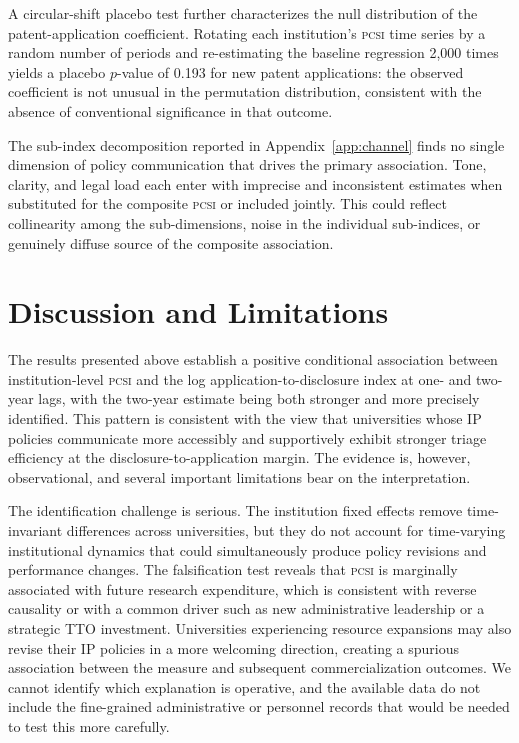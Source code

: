 \documentclass[12pt]{article}
\newcommand{\PCSI}{\textsc{pcsi}}
\begin{document}
A circular-shift placebo test further characterizes the null distribution of the patent-application
coefficient. Rotating each institution's \PCSI{} time series by a random number of periods
and re-estimating the baseline regression 2,000 times yields a placebo $p$-value of 0.193
for new patent applications: the observed coefficient is not unusual in the permutation
distribution, consistent with the absence of conventional significance in that outcome.

The sub-index decomposition reported in Appendix~\ref{app:channel} finds no single
dimension of policy communication that drives the primary association. Tone, clarity,
and legal load each enter with imprecise and inconsistent estimates when substituted for
the composite \PCSI{} or included jointly. This could reflect collinearity among the
sub-dimensions, noise in the individual sub-indices, or genuinely diffuse source of
the composite association.

\section{Discussion and Limitations}
\label{sec:discussion}

The results presented above establish a positive conditional association between
institution-level \PCSI{} and the log application-to-disclosure index at one- and
two-year lags, with the two-year estimate being both stronger and more precisely
identified. This pattern is consistent with the view that universities whose IP policies
communicate more accessibly and supportively exhibit stronger triage efficiency at the
disclosure-to-application margin. The evidence is, however, observational, and several
important limitations bear on the interpretation.

The identification challenge is serious. The institution fixed effects remove
time-invariant differences across universities, but they do not account for
time-varying institutional dynamics that could simultaneously produce policy revisions
and performance changes. The falsification test reveals that \PCSI{} is marginally
associated with future research expenditure, which is consistent with reverse causality
or with a common driver such as new administrative leadership or a strategic TTO
investment. Universities experiencing resource expansions may also revise their IP
policies in a more welcoming direction, creating a spurious association between the
measure and subsequent commercialization outcomes. We cannot identify which explanation
is operative, and the available data do not include the fine-grained administrative or
personnel records that would be needed to test this more carefully.
\end{document}
